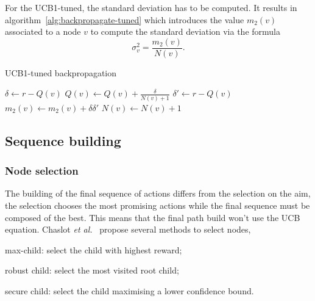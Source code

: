 \documentclass[oneside,twocolumn]{article}
\begin{document}
For the UCB1-tuned, the standard deviation has to be computed. It results in
algorithm~\ref{alg:backpropagate-tuned} which introduces the value \(m_2(v)\)
associated to a node \(v\) to compute the standard deviation via the formula
\begin{equation}
  \sigma^2_v = \frac{m_2(v)}{N(v)}.
\end{equation}
\begin{algorithm}
  \caption{UCB1-tuned backpropagation}\label{alg:backpropagate-tuned}
  \begin{algorithmic}
    \State{}\(\delta \gets r - Q(v)\)
    \State{}\(Q(v) \gets Q(v) + \frac{\delta}{N(v) + 1}\)
    \State{}\(\delta' \gets r - Q(v)\)
    \State{}\(m_2(v) \gets m_2(v) + \delta \delta'\)
    \State{}\(N(v) \gets N(v) + 1\)
    \EndProcedure{}
  \end{algorithmic}
\end{algorithm}


\subsection{Sequence building}
\subsubsection{Node selection}\label{sssec:node_selection}
The building of the final sequence of actions differs from the selection on the
aim, the selection chooses the most promising actions while the final sequence
must be composed of the best. This means that the final path build won't use the
UCB equation. Chaslot \textit{et al.}~\cite{browne2012survey} propose several
methods to select nodes,
\begin{compactitem}
  \item max-child: select the child with highest reward;
  \item robust child: select the most visited root child;
  \item secure child: select the child maximising a lower confidence bound.
\end{compactitem}
\end{document}
